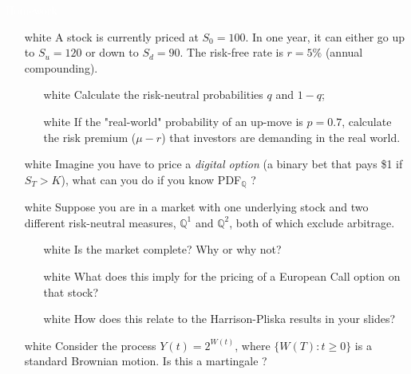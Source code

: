 \documentclass{beamer}
\begin{document}
	\begin{homework}
		\begin{frame}{\textcolor{white}{Homework}}
			\begin{itemize}
				\item[white] A stock is currently priced at $S_0=100$. In one year, it can either go up to $S_u=120$ or down to $S_d=90$. The risk-free rate is $r=5\%$ (annual compounding).
				\begin{itemize}
					\item[white] Calculate the risk-neutral probabilities $q$ and $1-q$;
					\item[white] If the "real-world" probability of an up-move is $p=0.7$, calculate the risk premium ($\mu - r$) that investors are demanding in the real world.
				\end{itemize}
				\item[white] Imagine you have to price a \emph{digital option} (a binary bet that pays \$1 if $S_T > K$), what can you do if you know PDF$_\mathbb{Q}$ ?
				\item[white] Suppose you are in a market with one underlying stock and two different risk-neutral measures, $\mathbb{Q}^1$ and $\mathbb{Q}^2$, both of which exclude arbitrage.
				\begin{itemize}
					\item[white] Is the market complete? Why or why not?
					\item[white] What does this imply for the pricing of a European Call option on that stock?
					\item[white] How does this relate to the Harrison-Pliska results in your slides?
				\end{itemize}
				\item[white] Consider the process $Y(t) = 2^{W(t)}$, where $\{W(T):t\geq 0\}$ is a standard Brownian motion. Is this a martingale ?
			\end{itemize}
		\end{frame}
	\end{homework}
\end{document}
